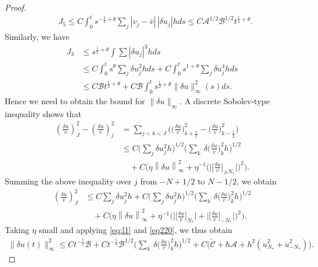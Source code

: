 \documentclass[10pt,a4paper]{amsart}
\begin{document}
\begin{proof}
\begin{align}
	&J_5\leq C\int_0^ts^{-\frac{1}{2}+\theta}\sum_{j}|v_j-\bar v|\,|\delta u_j| hds%
	\leq C\mathscr{A}^{1/2}\mathscr{B}^{1/2}t^{\frac{1}{4}+\theta}.\label{eq:ux-j5}
\end{align}
Similarly, we have
\begin{equation}\label{eq:ux-j3}
\begin{aligned}
J_3&\leq s^{\frac{1}{2}+\theta}\int\sum |\delta u_{j}|^{3}hds  \\
&\leq C\int_{0}^{t}s^{\theta}\sum_{j}\delta u_{j}^{2}hds+C\int_{0}^{t}s^{1+\theta}\sum_{j}\delta u_{j}^{4}hds \\
&\leq C\mathscr{B}t^{\frac{1}{2}+\theta}+C\mathscr{B}\int_{0}^{t}s^{\frac12+\theta}\|\delta u\|_{\infty}^2(s)ds.
\end{aligned}	
\end{equation}
Hence we need to obtain the bound for \(\|\delta u\|_{\infty}\). A discrete Sobolev-type inequality shows that
\[\begin{aligned}
\left({\frac{\delta u}{v}}\right)_J^{2}-\left({\frac{\delta u}{v}}\right)_j^{2}& =\sum_{j<k<J}\Big(\big(\frac{\delta u}{v}\big)_{k+\frac{1}{2}}^{2}-\big(\frac{\delta u}{v}\big)_{k-\frac{1}{2}}^{2}\Big) \\
&\leq C\Big(\sum_{j}\delta u_{j}^{2}h\Big)^{1/2}\Big(\sum_{k^{\prime}}\delta\big(\frac{\delta u}{v}\big)_{k}^{2}h\Big)^{1/2} \\
&\quad+C\Big(\eta\left\|\delta u\right\|_{\infty}^{2}+\eta^{-1}\big(\big|\big[\frac{\delta u}{v}\big]_{\pm N_* }\big|\big)^{2}\Big).
\end{aligned}\]
Summing the above inequality over $j$ from $-N+1/2$ to $N-1/2$, we obtain
\[\begin{aligned}
\left({\frac{\delta u}{v}}\right)_J^{2}&\leq C\sum_{j}\delta u_{j}^{2}h+
 C\Big(\sum_{j}\delta u_{j}^{2}h\Big)^{1/2}\Big(\sum_{k^{\prime}}\delta\big(\frac{\delta u}{v}\big)_{k}^{2}h\Big)^{1/2} \\
&\quad+C\Big(\eta\left\|\delta u\right\|_{\infty}^{2}+\eta^{-1}\big(\big|\big[\frac{\delta u}{v}\big]_{N_* }\big|+\big|\big[\frac{\delta u}{v}\big]_{-N_* }\big|\big)^{2}\Big).
\end{aligned}\]
Taking $\eta$ small and applying \eqref{eq:l1} and \eqref{eq220}, we thus obtain
\begin{equation}\label{eq:ux-infty}
\begin{aligned}
\|\delta u(t)\|_{\infty}^{2}\leq Ct^{-\frac12}\mathscr{B}+Ct^{-\frac14}\mathscr{B}^{1/2}\Big(\sum_{k^{\prime}}\delta\big(\frac{\delta u}{v}\big)_{k}^{2}h\Big)^{1/2}+C\big(\tilde{\mathscr{C}}+ h\mathscr{A}+h^{2}(\dot{u}_{N_* }^{2}+\dot{u}_{-N_* }^{2})\big).

\end{aligned}
\end{equation}
\end{proof}
\end{document}
